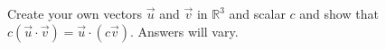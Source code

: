 {Create your own vectors $\vec u$ and $\vec v$  in $\mathbb{R}^3$  and scalar $c$ and show that $c(\vec u\cdot \vec v) = \vec u\cdot (c\vec v)$.
}
{Answers will vary.
}
